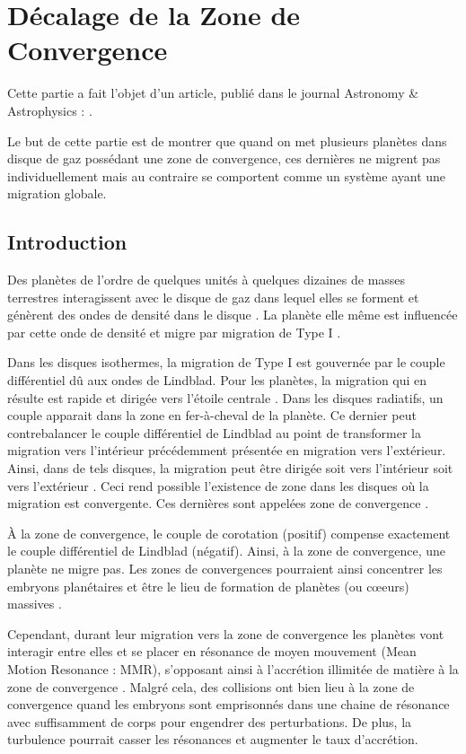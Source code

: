 
\section{Décalage de la Zone de Convergence}
Cette partie a fait l'objet d'un article, publié dans le journal Astronomy \& Astrophysics : \cite{cossou2013convergence}.

Le but de cette partie est de montrer que quand on met plusieurs planètes dans disque de gaz possédant une zone de convergence, ces dernières ne migrent pas individuellement mais au contraire se comportent comme un système ayant une migration globale. 

\subsection{Introduction}
Des planètes de l'ordre de quelques unités à quelques dizaines de masses terrestres interagissent avec le disque de gaz dans lequel elles se forment et génèrent des ondes de densité dans le disque \citep{goldreich1979excitation}. La planète elle même est influencée par cette onde de densité et migre par migration de Type I \citep{ward1997protoplanet}.

Dans les disques isothermes, la migration de Type I est gouvernée par le couple différentiel dû aux ondes de Lindblad. Pour les planètes, la migration qui en résulte est rapide et dirigée vers l'étoile centrale \citep{tanaka2002three}. Dans les disques radiatifs, un couple apparait dans la zone en fer-à-cheval de la planète. Ce dernier peut contrebalancer le couple différentiel de Lindblad au point de transformer la migration vers l'intérieur précédemment présentée en migration vers l'extérieur. Ainsi, dans de tels disques, la migration peut être dirigée soit vers l'intérieur soit vers l'extérieur \citep{paardekooper2006halting, kley2008migration}. Ceci rend possible l'existence de zone dans les disques où la migration est convergente. Ces dernières sont appelées zone de convergence \citep[CZs;][]{lyra2010orbital, paardekooper2011torque}.

\bigskip

À la zone de convergence, le couple de corotation (positif) compense exactement le couple différentiel de Lindblad (négatif). Ainsi, à la zone de convergence, une planète ne migre pas. Les zones de convergences pourraient ainsi concentrer les embryons planétaires et être le lieu de formation de planètes (ou cœeurs) massives \citep{lyra2010orbital, horn2012orbital}. 

Cependant, durant leur migration vers la zone de convergence les planètes vont interagir entre elles et se placer en résonance de moyen mouvement (Mean Motion Resonance : MMR), s'opposant ainsi à l'accrétion illimitée de matière à la zone de convergence \citep{morbidelli2008building, sandor2011formation}. Malgré cela, des collisions ont bien lieu à la zone de convergence quand les embryons sont emprisonnés dans une chaine de résonance avec suffisamment de corps pour engendrer des perturbations. De plus, la turbulence pourrait casser les résonances et augmenter le taux d'accrétion.

